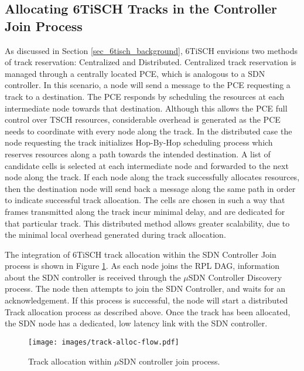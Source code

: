 
\subsection{Allocating 6TiSCH Tracks in the Controller Join Process}
\label{sec_motivation_track_alloc_sdn}

As discussed in Section \ref{sec_6tisch_background}, 6TiSCH envisions two methods of track reservation: Centralized and Distributed. Centralized track reservation is managed through a centrally located PCE, which is analogous to a SDN controller. In this scenario, a node will send a message to the PCE requesting a track to a destination. The PCE responds by scheduling the resources at each intermediate node towards that destination. Although this allows the PCE full control over TSCH resources, considerable overhead is generated as the PCE needs to coordinate with every node along the track. In the distributed case the node requesting the track initializes Hop-By-Hop scheduling process which reserves resources along a path towards the intended destination. A list of candidate cells is selected at each intermediate node and forwarded to the next node along the track. If each node along the track successfully allocates resources, then the destination node will send back a message along the same path in order to indicate successful track allocation. The cells are chosen in such a way that frames transmitted along the track incur minimal delay, and are dedicated for that particular track. This distributed method allows greater scalability, due to the minimal local overhead generated during track allocation.

The integration of 6TiSCH track allocation within the SDN Controller Join process is shown in Figure \ref{fig:usdn_track_aloc}. As each node joins the RPL DAG, information about the SDN controller is received through the $\mu$SDN Controller Discovery process. The node then attempts to join the SDN Controller, and waits for an acknowledgement. If this process is successful, the node will start a distributed Track allocation process as described above. Once the track has been allocated, the SDN node has a dedicated, low latency link with the SDN controller.

\begin{figure}[ht]
\centering
  \texttt{[image: images/track-alloc-flow.pdf]}
  \caption{Track allocation within $\mu$SDN controller join process.}
  \label{fig:usdn_track_aloc}
\end{figure}


